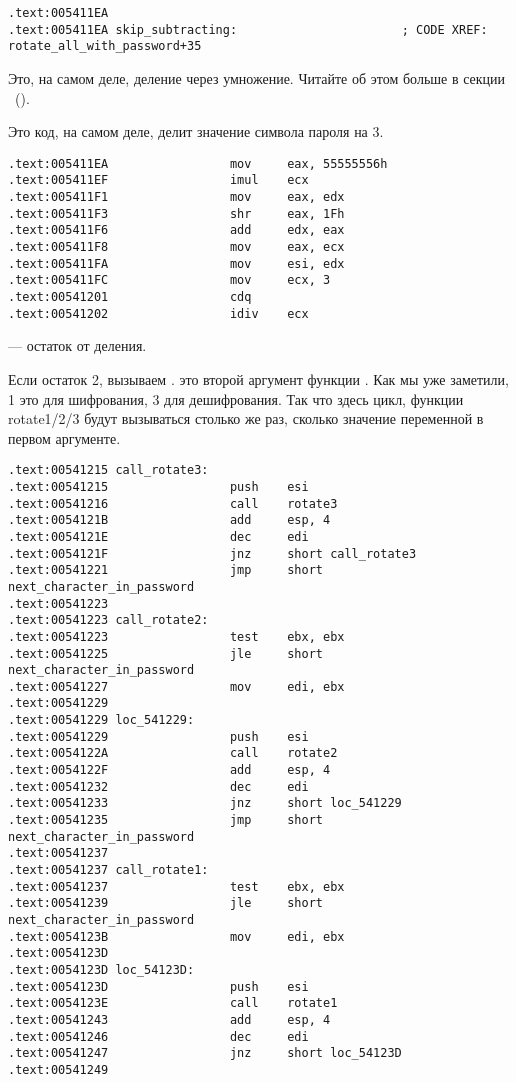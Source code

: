 \begin{lstlisting}[style=customasm]
.text:005411EA
.text:005411EA skip_subtracting:                       ; CODE XREF: rotate_all_with_password+35
\end{lstlisting}

Это, на самом деле, деление через умножение.
Читайте об этом больше в секции \q{\DivisionByMultSectionName}~().

Это код, на самом деле, делит значение символа пароля на 3.

\begin{lstlisting}[style=customasm]
.text:005411EA                 mov     eax, 55555556h
.text:005411EF                 imul    ecx
.text:005411F1                 mov     eax, edx
.text:005411F3                 shr     eax, 1Fh
.text:005411F6                 add     edx, eax
.text:005411F8                 mov     eax, ecx
.text:005411FA                 mov     esi, edx
.text:005411FC                 mov     ecx, 3
.text:00541201                 cdq
.text:00541202                 idiv    ecx
\end{lstlisting}

\EDX --- остаток от деления.



Если остаток 2, вызываем . 
\EDX это второй аргумент функции . 
Как мы уже заметили, 1 это для шифрования, 3 для дешифрования.
Так что здесь цикл, функции rotate1/2/3 будут вызываться столько же раз, сколько значение переменной
в первом аргументе.

\begin{lstlisting}[style=customasm]
.text:00541215 call_rotate3:
.text:00541215                 push    esi
.text:00541216                 call    rotate3
.text:0054121B                 add     esp, 4
.text:0054121E                 dec     edi
.text:0054121F                 jnz     short call_rotate3
.text:00541221                 jmp     short next_character_in_password
.text:00541223
.text:00541223 call_rotate2:
.text:00541223                 test    ebx, ebx
.text:00541225                 jle     short next_character_in_password
.text:00541227                 mov     edi, ebx
.text:00541229
.text:00541229 loc_541229:
.text:00541229                 push    esi
.text:0054122A                 call    rotate2
.text:0054122F                 add     esp, 4
.text:00541232                 dec     edi
.text:00541233                 jnz     short loc_541229
.text:00541235                 jmp     short next_character_in_password
.text:00541237
.text:00541237 call_rotate1:
.text:00541237                 test    ebx, ebx
.text:00541239                 jle     short next_character_in_password
.text:0054123B                 mov     edi, ebx
.text:0054123D
.text:0054123D loc_54123D:
.text:0054123D                 push    esi
.text:0054123E                 call    rotate1
.text:00541243                 add     esp, 4
.text:00541246                 dec     edi
.text:00541247                 jnz     short loc_54123D
.text:00541249
\end{lstlisting}


